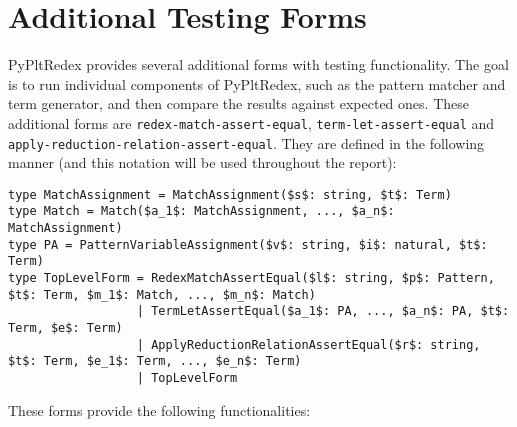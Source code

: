 \section{Additional Testing Forms}

PyPltRedex provides several additional forms with testing functionality. The goal is to run individual components of PyPltRedex, such as the pattern matcher and term generator, and then compare the results against expected ones. These additional forms are \texttt{redex-match-assert-equal}, \texttt{term-let-assert-equal} and \texttt{apply-reduction-relation-assert-equal}. They are defined in the following manner (and this notation will be used throughout the report):

\begin{lstlisting}
type MatchAssignment = MatchAssignment($s$: string, $t$: Term)
type Match = Match($a_1$: MatchAssignment, ..., $a_n$: MatchAssignment)
type PA = PatternVariableAssignment($v$: string, $i$: natural, $t$: Term)
type TopLevelForm = RedexMatchAssertEqual($l$: string, $p$: Pattern, $t$: Term, $m_1$: Match, ..., $m_n$: Match)
                  | TermLetAssertEqual($a_1$: PA, ..., $a_n$: PA, $t$: Term, $e$: Term)
                  | ApplyReductionRelationAssertEqual($r$: string, $t$: Term, $e_1$: Term, ..., $e_n$: Term)
                  | TopLevelForm
\end{lstlisting}

These forms provide the following functionalities:

